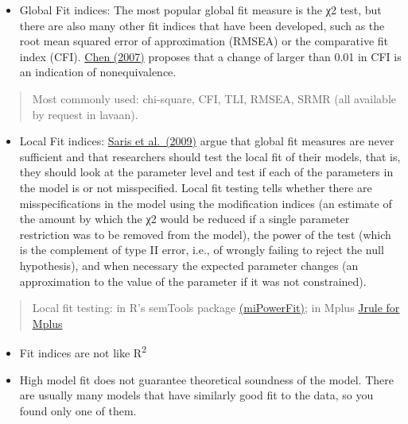 \documentclass[
]{book}
\providecommand{\tightlist}{%
  \setlength{\itemsep}{0pt}\setlength{\parskip}{0pt}}
\begin{document}
\begin{itemize}
\tightlist
\item
  Global Fit indices: The most popular global fit measure is the χ2 test, but there are also many other fit indices that have been developed, such as the root mean squared error of approximation (RMSEA) or the comparative fit index (CFI). \href{https://www.tandfonline.com/doi/abs/10.1080/10705510701301834}{Chen (2007)} proposes that a change of larger than 0.01 in CFI is an indication of nonequivalence.
\end{itemize}

\begin{quote}
Most commonly used: chi-square, CFI, TLI, RMSEA, SRMR (all available by request in lavaan).
\end{quote}

\begin{itemize}
\tightlist
\item
  Local Fit indices: \href{https://www.tandfonline.com/doi/abs/10.1080/10705510903203433}{Saris et al.~(2009)} argue that global fit measures are never sufficient and that researchers should test the local fit of their models, that is, they should look at the parameter level and test if each of the parameters in the model is or not misspecified. Local fit testing tells whether there are misspecifications in the model using the modification indices (an estimate of the amount by which the χ2 would be reduced if a single parameter restriction was to be removed from the model), the power of the test (which is the complement of type II error, i.e., of wrongly failing to reject the null hypothesis), and when necessary the expected parameter changes (an approximation to the value of the parameter if it was not constrained).
\end{itemize}

\begin{quote}
Local fit testing: in R's semTools package \href{https://rdrr.io/cran/semTools/man/miPowerFit.html}{(miPowerFit)}; in Mplus \href{https://daob.nl/software/}{Jrule for Mplus}
\end{quote}

\begin{itemize}
\item
  Fit indices are not like R\textsuperscript{2}
\item
  High model fit does not guarantee theoretical soundness of the model. There are usually many models that have similarly good fit to the data, so you found only one of them.
\end{itemize}
\end{document}
